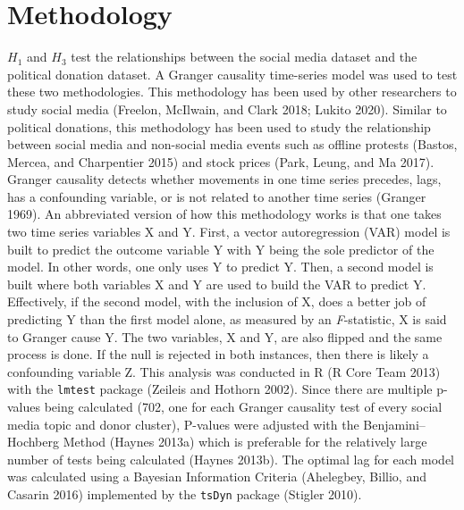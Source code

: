 \documentclass[12pt,]{article}
\begin{document}
\hypertarget{methodology}{%
\section{Methodology}\label{methodology}}

\(H_{1}\) and \(H_{3}\) test the relationships between the social media
dataset and the political donation dataset. A Granger causality
time-series model was used to test these two methodologies. This
methodology has been used by other researchers to study social media
(Freelon, McIlwain, and Clark 2018; Lukito 2020). Similar to political
donations, this methodology has been used to study the relationship
between social media and non-social media events such as offline
protests (Bastos, Mercea, and Charpentier 2015) and stock prices (Park,
Leung, and Ma 2017). Granger causality detects whether movements in one
time series precedes, lags, has a confounding variable, or is not
related to another time series (Granger 1969). An abbreviated version of
how this methodology works is that one takes two time series variables X
and Y. First, a vector autoregression (VAR) model is built to predict
the outcome variable Y with Y being the sole predictor of the model. In
other words, one only uses Y to predict Y. Then, a second model is built
where both variables X and Y are used to build the VAR to predict Y.
Effectively, if the second model, with the inclusion of X, does a better
job of predicting Y than the first model alone, as measured by an
\emph{F}-statistic, X is said to Granger cause Y. The two variables, X
and Y, are also flipped and the same process is done. If the null is
rejected in both instances, then there is likely a confounding variable
Z. This analysis was conducted in R (R Core Team 2013) with the
\texttt{lmtest} package (Zeileis and Hothorn 2002). Since there are
multiple p-values being calculated (702, one for each Granger causality
test of every social media topic and donor cluster), P-values were
adjusted with the Benjamini--Hochberg Method (Haynes 2013a) which is
preferable for the relatively large number of tests being calculated
(Haynes 2013b). The optimal lag for each model was calculated using a
Bayesian Information Criteria (Ahelegbey, Billio, and Casarin 2016)
implemented by the \texttt{tsDyn} package (Stigler 2010).
\end{document}
